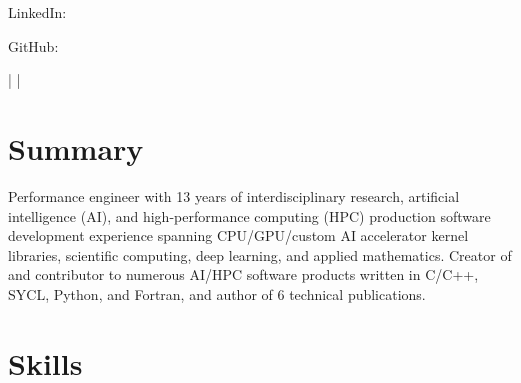 \documentclass[letterpaper,10pt]{article}
\begin{document}
\href{\AuthorWebsiteLink}{\scshape\huge\Author}\vspace{2pt}

\begin{small}
  LinkedIn: \href{\AuthorLinkedInLink}{\AuthorLinkedInText}

  \vspace{2pt}
  GitHub: \href{\AuthorGitHubLink}{\AuthorGitHubText}

  \vspace{1pt}
  \AuthorAddress{} |
  \href{mailto:\AuthorEmail}{\AuthorEmail} |
  \href{\AuthorPhoneLink}{\AuthorPhoneText}
\end{small}

\section{Summary}
Performance engineer with 13 years of interdisciplinary research,
artificial intelligence (AI), and high-performance computing (HPC) production
software development experience spanning CPU/GPU/custom AI accelerator kernel
libraries, scientific computing, deep learning, and applied mathematics.
Creator of and contributor to numerous AI/HPC software products written in
C/C++, SYCL, Python, and Fortran, and author of 6 technical publications.

\section{Skills}
  \resumeSubItemListStart
  \resumeSubItemListEnd

\vspace{-241.5pt}
\end{document}
